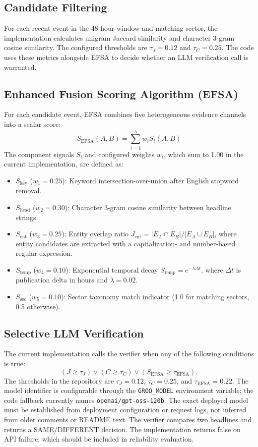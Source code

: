 \documentclass[conference]{IEEEtran}
\begin{document}
\subsection{Candidate Filtering}
For each recent event in the 48-hour window and matching sector, the implementation calculates unigram Jaccard similarity and character 3-gram cosine similarity. The configured thresholds are $\tau_J=0.12$ and $\tau_C=0.25$. The code uses these metrics alongside EFSA to decide whether an LLM verification call is warranted.

\subsection{Enhanced Fusion Scoring Algorithm (EFSA)}
For each candidate event, EFSA combines five heterogeneous evidence channels into a scalar score:
\begin{equation}
S_{\text{EFSA}}(A, B) = \sum_{i=1}^{5} w_i S_i(A, B)
\label{eq:efsa}
\end{equation}
The component signals $S_i$ and configured weights $w_i$, which sum to 1.00 in the current implementation, are defined as:
\begin{itemize}
    \item $S_{\text{key}}$ ($w_1 = 0.25$): Keyword intersection-over-union after English stopword removal.
    \item $S_{\text{head}}$ ($w_2 = 0.30$): Character 3-gram cosine similarity between headline strings.
    \item $S_{\text{ent}}$ ($w_3 = 0.25$): Entity overlap ratio $J_{\text{ent}} = |E_A \cap E_B| / |E_A \cup E_B|$, where entity candidates are extracted with a capitalization- and number-based regular expression.
    \item $S_{\text{temp}}$ ($w_4 = 0.10$): Exponential temporal decay $S_{\text{temp}} = e^{-\lambda \Delta t}$, where $\Delta t$ is publication delta in hours and $\lambda = 0.02$.
    \item $S_{\text{sec}}$ ($w_5 = 0.10$): Sector taxonomy match indicator (1.0 for matching sectors, 0.5 otherwise).
\end{itemize}

\subsection{Selective LLM Verification}
The current implementation calls the verifier when any of the following conditions is true:
\begin{equation}
(J \geq \tau_J) \lor (C \geq \tau_C) \lor (S_{\text{EFSA}} \geq \tau_{\text{EFSA}}).
\label{eq:decision}
\end{equation}
The thresholds in the repository are $\tau_J=0.12$, $\tau_C=0.25$, and $\tau_{\text{EFSA}}=0.22$. The model identifier is configurable through the \texttt{GROQ\_MODEL} environment variable; the code fallback currently names \texttt{openai/gpt-oss-120b}. The exact deployed model must be established from deployment configuration or request logs, not inferred from older comments or README text. The verifier compares two headlines and returns a SAME/DIFFERENT decision. The implementation returns false on API failure, which should be included in reliability evaluation.
\end{document}

